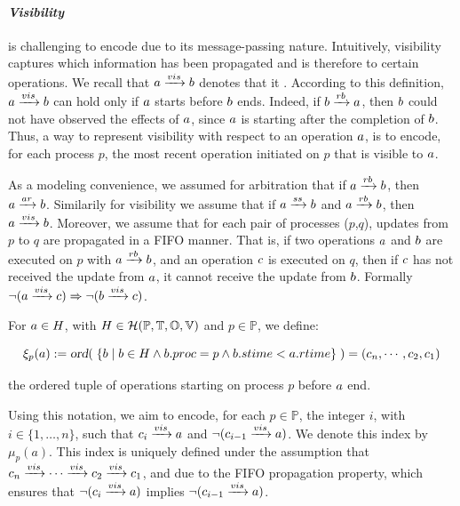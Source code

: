 \documentclass[12pt]{article}
\begin{document}
\noindent\paragraph{\textsl{Visibility}} is challenging to encode due to its message-passing nature. Intuitively, visibility captures which information has been propagated and is therefore  to certain operations. 
We recall that $a\xrightarrow{vis}b$ denotes that it \cite{PrinciplesOfEventualConsistency}. According to this definition, $a\xrightarrow{vis}b$ can hold only if $a$ starts before $b$ ends. Indeed, if $b\xrightarrow{rb}a$, then $b$ could not have observed the effects of $a$, since $a$ is starting after the completion of $b$. Thus, a way to represent visibility with respect to an operation $a$, is to encode, for each process $p$, the most recent operation initiated on $p$ that is visible to $a$. 

As a modeling convenience, we assumed for arbitration that if $a \xrightarrow{rb} b$, then $a \xrightarrow{ar} b$. Similarily for visibility we assume that if $a \xrightarrow{ss} b$ and $a \xrightarrow{rb} b$, then $a \xrightarrow{vis} b$. Moreover, we assume that for each pair of processes ($p$,$q$), updates from $p$ to $q$ are propagated in a FIFO manner. That is, if two operations $a$ and $b$ are executed on $p$ with $a\xrightarrow{rb}b$, and an operation $c$ is executed on $q$, then if $c$ has not received the update from $a$, it cannot receive the update from $b$. Formally $\neg(a\xrightarrow{vis}c)\Rightarrow\neg(b\xrightarrow{vis}c)$. 

For $a\in H$, with $H\in\mathcal{H}(\mathbb{P}, \mathbb{T}, \mathbb{O}, \mathbb{V})$ and $p\in\mathbb{P}$, we define:

\[
\xi_p(a):=\textsl{ord}(\;\{ b\;|\;b\in H\land b.proc=p\land b.stime <a.rtime\}\;)=(c_n,\cdots,c_2,c_1)
\]

the ordered tuple of operations starting on process $p$ before $a$ end. 

Using this notation, we aim to encode, for each $p\in\mathbb{P}$, the integer $i$, with $i\in \{1, \ldots, n\}$, such that \mbox{$c_i\xrightarrow{vis}a$} and $\neg(c_{i-1}\xrightarrow{vis}a)$. We denote this index by $\mu_p(a)$. This index is uniquely defined under the assumption that $c_n\xrightarrow{vis}\cdots\xrightarrow{vis}c_2\xrightarrow{vis}c_1$, and due to the FIFO propagation property, which ensures that $\neg(c_i\xrightarrow{vis}a)$ implies $\neg(c_{i-1}\xrightarrow{vis}a)$.
\end{document}
